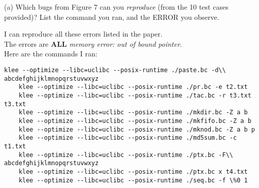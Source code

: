 \documentclass[12pt,letterpaper]{article}
\begin{document}
\noindent (a) Which bugs from Figure 7 can you \emph{reproduce} (from
the 10 test cases provided)? List the command you ran, and the ERROR
you observe.
\begin{mdframed}
  I can reproduce all these errors listed in the paper.\\
  The errors are \textbf{ALL} \textit{memory error: out of bound pointer}.\\
  Here are the commands I ran:
  \begin{lstlisting}[basicstyle=\tiny]
    klee --optimize --libc=uclibc --posix-runtime ./paste.bc -d\\ abcdefghijklmnopqrstuvwxyz
    klee --optimize --libc=uclibc --posix-runtime ./pr.bc -e t2.txt
    klee --optimize --libc=uclibc --posix-runtime ./tac.bc -r t3.txt t3.txt
    klee --optimize --libc=uclibc --posix-runtime ./mkdir.bc -Z a b
    klee --optimize --libc=uclibc --posix-runtime ./mkfifo.bc -Z a b
    klee --optimize --libc=uclibc --posix-runtime ./mknod.bc -Z a b p
    klee --optimize --libc=uclibc --posix-runtime ./md5sum.bc -c t1.txt
    klee --optimize --libc=uclibc --posix-runtime ./ptx.bc -F\\ abcdefghijklmnopqrstuvwxyz
    klee --optimize --libc=uclibc --posix-runtime ./ptx.bc x t4.txt
    klee --optimize --libc=uclibc --posix-runtime ./seq.bc -f \%0 1
  \end{lstlisting}
\end{mdframed}

\newpage
\end{document}
